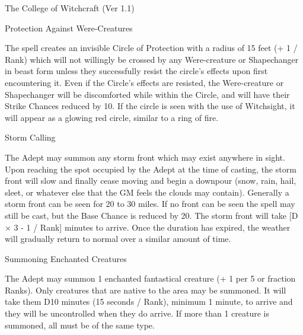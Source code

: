 \begin{Chapter}{The College of Witchcraft (Ver 1.1)}
\begin{spell}[G-9]{Protection Against Were-Creatures}
\begin{effects}
The spell creates an invisible Circle of Protection with a radius of
15 feet (+ 1 / Rank) which will not willingly be crossed by any
Were-creature or Shapechanger in beast form unless they successfully
resist the circle’s effects upon first encountering it.  Even if the
Circle’s effects are resisted, the Were-creature or Shapechanger will
be discomforted while within the Circle, and will have their Strike
Chances reduced by 10.  If the circle is seen with the use of
Witchsight, it will appear as a glowing red circle, similar to a ring
of fire.
\end{effects}
\end{spell}

\begin{spell}[G-10]{Storm Calling}

\begin{effects}
The Adept may summon any storm front which may exist anywhere in
sight. Upon reaching the spot occupied by the Adept at the time of
casting, the storm front will slow and finally cease moving and begin
a downpour (snow, rain, hail, sleet, or whatever else that the GM
feels the clouds may contain).  Generally a storm front can be seen
for 20 to 30 miles. If no front can be seen the spell may still be
cast, but the Base Chance is reduced by 20. The storm front will take
[D × 3 - 1 / Rank] minutes to arrive.  Once the duration has expired,
the weather will gradually return to normal over a similar amount of
time.
\end{effects}
\end{spell}

\begin{spell}[G-11]{Summoning Enchanted Creatures}

\begin{effects}
The Adept may summon 1 enchanted fantastical creature (+ 1 per 5 or
fraction Ranks).  Only creatures that are native to the area may be
summoned.  It will take them D10 minutes (15 seconds / Rank), minimum
1 minute, to arrive and they will be uncontrolled when they do arrive.
If more than 1 creature is summoned, all must be of the same type.
\end{effects}
\end{spell}


\end{Chapter}

